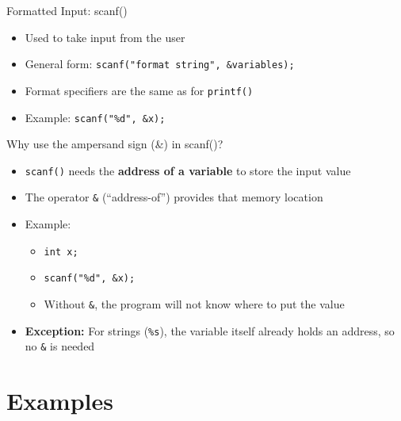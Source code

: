 \documentclass[12pt, aspectratio=169]{beamer}
\begin{document}
    \begin{frame}{Formatted Input: scanf()}
        \begin{itemize}
            \item Used to take input from the user
            \item General form: \texttt{scanf("format string", \&variables);}
            \item Format specifiers are the same as for \texttt{printf()}
            \item Example: \texttt{scanf("\%d", \&x);}
        \end{itemize}
    \end{frame}


    \begin{frame}{Why use the ampersand sign (\&) in scanf()?}
        \begin{itemize}
            \item \texttt{scanf()} needs the \textbf{address of a variable} to store the input value
            \item The operator \texttt{\&} (“address-of”) provides that memory location
            \item Example:
                \begin{itemize}
                    \item \texttt{int x;}
                    \item \texttt{scanf("\%d", \&x);}  %
                    \item Without \texttt{\&}, the program will not know where to put the value
                \end{itemize}
            \item \textbf{Exception:} For strings (\texttt{\%s}), the variable itself already holds an address, so no \texttt{\&} is needed
        \end{itemize}
    \end{frame}


    \section{Examples}

\end{document}
